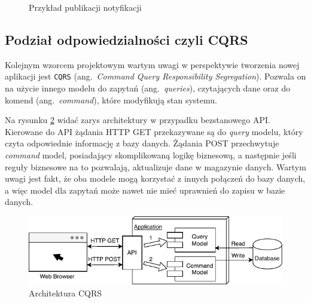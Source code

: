 \begin{figure}[h]
	\centering
	\caption{Przykład publikacji notyfikacji}
	\label{fig:mediatR-Event}
\end{figure}

\subsection{Podział odpowiedzialności czyli CQRS}
\label{subsec:cqrs}

Kolejnym wzorcem projektowym wartym uwagi w perspektywie tworzenia nowej aplikacji jest \texttt{CQRS} (ang.~\emph{Command Query Responsibility Segregation}). Pozwala on na użycie innego modelu do zapytań (ang.~\emph{queries}), czytających dane oraz do komend (ang.~\emph{command}), które modyfikują stan systemu. 

Na rysunku \ref{fig:cqrs-architecture} widać zarys architektury w przypadku bezstanowego API. Kierowane do API żądania HTTP GET przekazywane są do \emph{query} modelu, który czyta odpowiednie informację z bazy danych. Żądania POST przechwytuje \emph{command} model, posiadający skomplikowaną logikę biznesową, a następnie jeśli reguły biznesowe na to pozwalają, aktualizuje dane w magazynie danych. Wartym uwagi jest fakt, że oba modele mogą korzystać z innych połączeń do bazy danych, a więc model dla zapytań może nawet nie mieć uprawnień do zapisu w bazie danych.

\begin{figure}[h]
	\centering
	\includegraphics[width=.9\linewidth]{rys02/cqrs01.pdf}
	\caption{Architektura CQRS}
	\label{fig:cqrs-architecture}
\end{figure}

